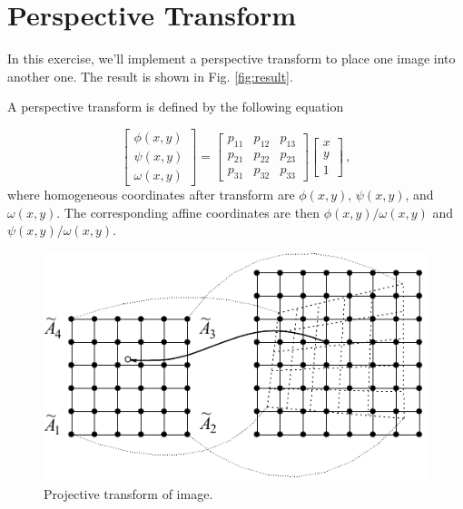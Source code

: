 \documentclass[12pt]{article}
\begin{document}
\section*{Perspective Transform}

In this exercise, we'll implement a perspective transform to place one image into another one.
The result is shown in Fig. \ref{fig:result}.

A perspective transform is defined by the following equation

\begin{equation}
    \label{eq:proj}
    \begin{bmatrix}
        \phi(x, y) \\
        \psi(x, y) \\
        \omega(x, y)
    \end{bmatrix}
    =
    \begin{bmatrix}
        p_{11} & p_{12} & p_{13} \\
        p_{21} & p_{22} & p_{23} \\
        p_{31} & p_{32} & p_{33}
    \end{bmatrix}
    \begin{bmatrix}
        x \\
        y \\
        1
    \end{bmatrix}
    \, ,
\end{equation}
where homogeneous coordinates after transform are $\phi(x, y)$, $\psi(x, y)$, and $\omega(x, y)$.
The corresponding affine coordinates are then $\phi(x, y) / \omega(x, y)$ and $\psi(x, y) / \omega(x, y)$.

\begin{figure}[th]
    \begin{center}
        \includegraphics[scale=1.0]{img_6_7}
    \end{center}
    \caption{Projective transform of image.}
    \label{img:6_7}
\end{figure}
\end{document}
